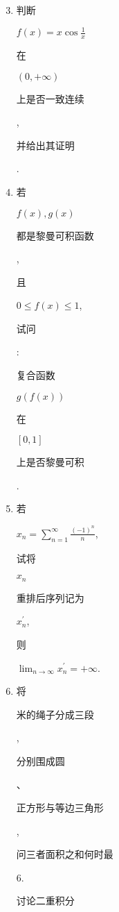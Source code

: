 \documentclass[10pt]{article}
\begin{document}
\begin{enumerate}
  \setcounter{enumi}{2}
  \item \begin{CJK}{UTF8}{mj}判断\end{CJK} $f(x)=x \cos \frac{1}{x}$ \begin{CJK}{UTF8}{mj}在\end{CJK} $(0,+\infty)$ \begin{CJK}{UTF8}{mj}上是否一致连续\end{CJK}, \begin{CJK}{UTF8}{mj}并给出其证明\end{CJK}.

  \item \begin{CJK}{UTF8}{mj}若\end{CJK} $f(x), g(x)$ \begin{CJK}{UTF8}{mj}都是黎曼可积函数\end{CJK}, \begin{CJK}{UTF8}{mj}且\end{CJK} $0 \leq f(x) \leq 1$, \begin{CJK}{UTF8}{mj}试问\end{CJK}: \begin{CJK}{UTF8}{mj}复合函数\end{CJK} $g(f(x))$ \begin{CJK}{UTF8}{mj}在\end{CJK} $[0,1]$ \begin{CJK}{UTF8}{mj}上是否黎曼可积\end{CJK}.

  \item \begin{CJK}{UTF8}{mj}若\end{CJK} $x_{n}=\sum_{n=1}^{\infty} \frac{(-1)^{n}}{n}$, \begin{CJK}{UTF8}{mj}试将\end{CJK} $x_{n}$ \begin{CJK}{UTF8}{mj}重排后序列记为\end{CJK} $x_{n}^{\prime}$, \begin{CJK}{UTF8}{mj}则\end{CJK} $\lim _{n \rightarrow \infty} x_{n}^{\prime}=+\infty$.

  \item \begin{CJK}{UTF8}{mj}将\end{CJK} \begin{CJK}{UTF8}{mj}米的绳子分成三段\end{CJK}, \begin{CJK}{UTF8}{mj}分别围成圆\end{CJK}、\begin{CJK}{UTF8}{mj}正方形与等边三角形\end{CJK}, \begin{CJK}{UTF8}{mj}问三者面积之和何时最\end{CJK} 6. \begin{CJK}{UTF8}{mj}讨论二重积分\end{CJK}

\end{enumerate}
\end{document}
